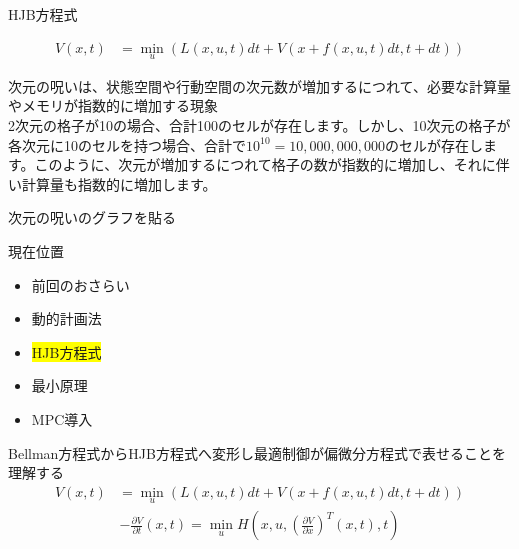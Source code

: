 \documentclass[dvipdfmx,12pt]{beamer}
\begin{document}
    \begin{frame}{HJB方程式}
        \footnotesize
        \begin{tcolorbox}[title=Bellman方程式]
            \begin{align*}
                V(x, t) &= \min_u \left( L(x, u, t) dt + V \left( x + f(x, u, t) dt, t + dt \right) \right)
            \end{align*}
        \end{tcolorbox}
        \begin{tcolorbox}[title=次元の呪い]
            次元の呪いは、状態空間や行動空間の次元数が増加するにつれて、必要な計算量やメモリが指数的に増加する現象 \\
            2次元の格子が10の場合、合計100のセルが存在します。しかし、10次元の格子が各次元に10のセルを持つ場合、合計で$10^10 = 10,000,000,000$のセルが存在します。このように、次元が増加するにつれて格子の数が指数的に増加し、それに伴い計算量も指数的に増加します。
        \end{tcolorbox}
        次元の呪いのグラフを貼る \\
        \centering
    \end{frame}

    \begin{frame}{現在位置}
        \footnotesize
        \begin{itemize}
            \item 前回のおさらい
            \item 動的計画法
            \item \colorbox{yellow}{HJB方程式}
            \item 最小原理
            \item MPC導入
        \end{itemize}
        Bellman方程式からHJB方程式へ変形し最適制御が偏微分方程式で表せることを理解する\\
        \begin{align*}
            V(x, t) &= \min_u \left( L(x, u, t) dt + V \left( x + f(x, u, t) dt, t + dt \right) \right)        
        \end{align*}
        \begin{align*}
            -\frac{\partial V}{\partial t}\left(x,t\right) = \min _u H\left(x, u, \left( \frac{\partial V}{\partial x} \right)^T\left(x, t\right), t \right)
        \end{align*}
    \end{frame}
\end{document}
